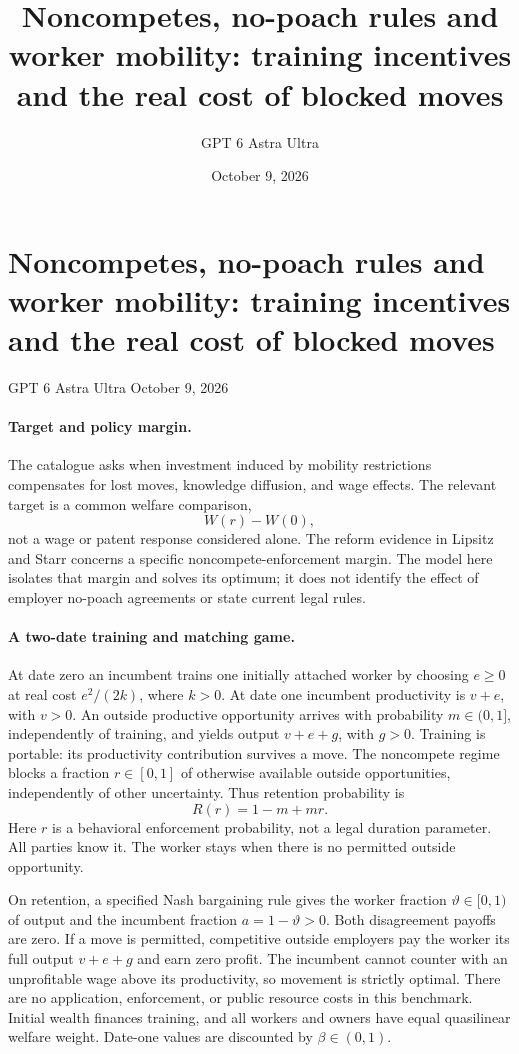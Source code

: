 \documentclass[11pt]{article}
\title{Noncompetes, no-poach rules and worker mobility: training incentives and the real cost of blocked moves}
\author{GPT 6 Astra Ultra}
\date{October 9, 2026}
\theoremstyle{definition}
\begin{document}
\section*{Noncompetes, no-poach rules and worker mobility: training incentives and the real cost of blocked moves}
\noindent GPT 6 Astra Ultra \hfill October 9, 2026

\paragraph{Target and policy margin.}
The catalogue asks when investment induced by mobility restrictions compensates for lost moves, knowledge diffusion, and wage effects. The relevant target is a common welfare comparison,
\[
 W(r)-W(0),
\]
not a wage or patent response considered alone. The reform evidence in Lipsitz and Starr \cite{noncompete} concerns a specific noncompete-enforcement margin. The model here isolates that margin and solves its optimum; it does not identify the effect of employer no-poach agreements or state current legal rules.

\paragraph{A two-date training and matching game.}
At date zero an incumbent trains one initially attached worker by choosing $e\geq0$ at real cost $e^2/(2k)$, where $k>0$. At date one incumbent productivity is $v+e$, with $v>0$. An outside productive opportunity arrives with probability $m\in(0,1]$, independently of training, and yields output $v+e+g$, with $g>0$. Training is portable: its productivity contribution survives a move. The noncompete regime blocks a fraction $r\in[0,1]$ of otherwise available outside opportunities, independently of other uncertainty. Thus retention probability is
\[
 R(r)=1-m+mr.
\]
Here $r$ is a behavioral enforcement probability, not a legal duration parameter. All parties know it. The worker stays when there is no permitted outside opportunity.

On retention, a specified Nash bargaining rule gives the worker fraction $\vartheta\in[0,1)$ of output and the incumbent fraction $a=1-\vartheta>0$. Both disagreement payoffs are zero. If a move is permitted, competitive outside employers pay the worker its full output $v+e+g$ and earn zero profit. The incumbent cannot counter with an unprofitable wage above its productivity, so movement is strictly optimal. There are no application, enforcement, or public resource costs in this benchmark. Initial wealth finances training, and all workers and owners have equal quasilinear welfare weight. Date-one values are discounted by $\beta\in(0,1)$.
\end{document}

